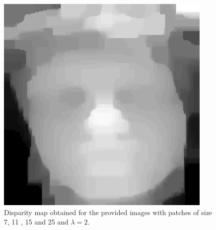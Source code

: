 \documentclass[]{article}
\begin{document}
\begin{figure}[h]
\begin{minipage}{0.24\linewidth}
	\end{minipage}\hfill
	\begin{minipage}{0.24\linewidth}
		\includegraphics[width=\linewidth]{results/thierry_n12_l2.png}
	\end{minipage}
	\caption{Disparity map obtained for the provided images with patches of size 7, 11 , 15 and 25 and $\lambda = 2$.}
	\label{fig:win}
\end{figure}
\end{document}
